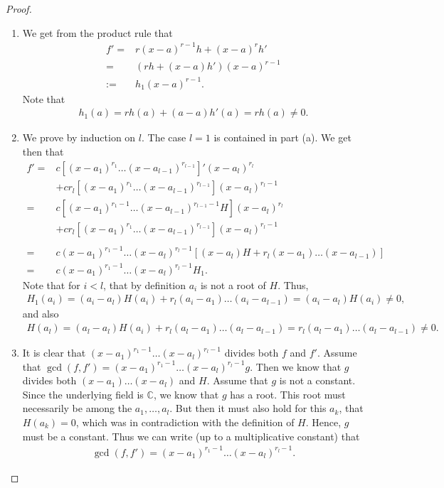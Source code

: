 \begin{proof}
\begin{enumerate}
    \item We get from the product rule that
    \begin{align*}
        f'
        =& r(x-a)^{r-1} h + (x-a)^r h'\\
        =& (rh + (x-a) h') (x-a)^{r-1}\\
        := & h_1 (x-a)^{r-1}.
    \end{align*}
    Note that
    \begin{align*}
        h_1(a) = rh(a) + (a-a)h'(a) = rh(a)\neq 0.
    \end{align*}
    \item We prove by induction on $l$. 
    The case $l=1$ is contained in part (a). 
    We get then that
    \begin{align*}
        f'
        =& c\left[(x-a_1)^{r_1} \dots (x-a_{l-1})^{r_{l-1}}\right]' (x-a_l)^{r_l}\\
        & + cr_l \left[(x-a_1)^{r_1} \dots (x-a_{l-1})^{r_{l-1}}\right] (x-a_l)^{r_l-1}\\
        =& c\left[(x-a_1)^{r_1-1}\dots(x-a_{l-1})^{r_{l-1}-1}H\right] (x-a_l)^{r_l}\\
        & + cr_l \left[(x-a_1)^{r_1} \dots (x-a_{l-1})^{r_{l-1}}\right] (x-a_l)^{r_l-1}\\\\
        =& c(x-a_1)^{r_1-1}\dots(x-a_l)^{r_l-1} \left[ (x-a_l)H +r_l (x-a_1) \dots (x-a_{l-1})\right]\\
        =& c(x-a_1)^{r_1-1}\dots(x-a_l)^{r_l-1} H_1.
    \end{align*}
    Note that for $i<l$, that by definition $a_i$ is not a root of $H$. Thus,
    \begin{align*}
        H_1(a_i) 
        = (a_i-a_l)H(a_i) + r_l(a_i-a_1) \dots (a_i-a_{l-1}) 
        = (a_i - a_l)H(a_i)\neq 0,
    \end{align*}
    and also
    \begin{align*}
        H(a_l) 
        = (a_l-a_l)H(a_i) + r_l(a_l-a_1) \dots (a_l-a_{l-1})
        = r_l(a_l-a_1) \dots (a_l-a_{l-1}) \neq 0.
    \end{align*}
    \item It is clear that $(x-a_1)^{r_1 - 1} \dots (x - a_l)^{r_l -1}$ divides both $f$ and $f'$. 
    Assume that $\gcd(f,f') = (x-a_1)^{r_1 - 1} \dots (x - a_l)^{r_l -1} g$. 
    Then we know that $g$ divides both $(x-a_1)\dots(x-a_l)$ and $H$. 
    Assume that $g$ is not a constant. 
    Since the underlying field is $\mathbb{C}$, we know that $g$ has a root. 
    This root must necessarily be among the $a_1,\dots,a_l$. 
    But then it must also hold for this $a_k$, that $H(a_k) = 0$, which was in contradiction with the definition of $H$. 
    Hence, $g$ must be a constant. 
    Thus we can write (up to a multiplicative constant) that
    \begin{align*}
        \gcd(f,f') = (x-a_1)^{r_1 - 1} \dots (x - a_l)^{r_l -1}.
    \end{align*}
\end{enumerate}
\end{proof}

